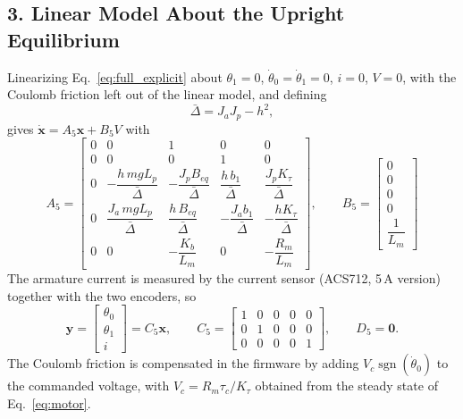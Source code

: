 \documentclass[a4paper,11pt]{article}
\newcommand{\sgn}{\operatorname{sgn}}
\begin{document}
\subsection{3. Linear Model About the Upright Equilibrium}
Linearizing Eq.~\eqref{eq:full_explicit} about $\theta_1 = 0$, $\dot\theta_0 = \dot\theta_1 = 0$, $i = 0$, $V = 0$, with the Coulomb friction left out of the linear model, and defining
\begin{equation}
  \bar\Delta = J_a J_p - h^2 ,
\end{equation}
gives $\dot{\mathbf{x}} = A_5 \mathbf{x} + B_5 V$ with
\begin{equation}
\boxed{
A_5 = \begin{bmatrix}
0 & 0 & 1 & 0 & 0\\
0 & 0 & 0 & 1 & 0\\[2pt]
0 & -\dfrac{h\, m g L_p}{\bar\Delta} & -\dfrac{J_p B_{eq}}{\bar\Delta} & \dfrac{h\, b_1}{\bar\Delta} & \dfrac{J_p K_\tau}{\bar\Delta}\\[8pt]
0 & \dfrac{J_a\, m g L_p}{\bar\Delta} & \dfrac{h\, B_{eq}}{\bar\Delta} & -\dfrac{J_a b_1}{\bar\Delta} & -\dfrac{h K_\tau}{\bar\Delta}\\[8pt]
0 & 0 & -\dfrac{K_b}{L_m} & 0 & -\dfrac{R_m}{L_m}
\end{bmatrix},
\qquad
B_5 = \begin{bmatrix} 0 \\ 0 \\ 0 \\ 0 \\ \dfrac{1}{L_m} \end{bmatrix}
}
\label{eq:ss5}
\end{equation}
The armature current is measured by the current sensor (ACS712, 5\,A version) together with the two encoders, so
\begin{equation}
  \mathbf{y} = \begin{bmatrix} \theta_0 \\ \theta_1 \\ i \end{bmatrix} = C_5 \mathbf{x}, \qquad
  C_5 = \begin{bmatrix} 1 & 0 & 0 & 0 & 0 \\ 0 & 1 & 0 & 0 & 0 \\ 0 & 0 & 0 & 0 & 1 \end{bmatrix}, \qquad
  D_5 = \mathbf{0} .
\end{equation}
The Coulomb friction is compensated in the firmware by adding $V_c \sgn(\dot\theta_0)$ to the commanded voltage, with $V_c = R_m \tau_c / K_\tau$ obtained from the steady state of Eq.~\eqref{eq:motor}.
\end{document}
